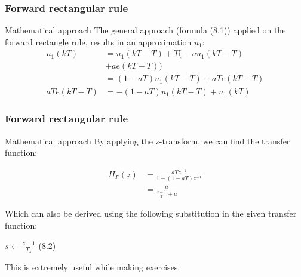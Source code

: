\begin{frame}
	\frametitle{Forward rectangular rule}
	\begin{block}{Mathematical approach}
		The general approach (formula (8.1)) applied on the forward rectangle rule, results in an approximation $u_1$:
		\begin{align*}
		u_1(kT)& =u_1(kT - T) + T\big(-au_1(kT - T)\\
		& + ae(kT - T) \big)\\
		& =(1 - aT)u_1(kT - T) + aTe(kT - T)\\
		aTe(kT-T) &= -(1 - aT)u_1(kT -T) + u_1(kT) 
		\end{align*}
	\end{block}
\end{frame}

\begin{frame}
	\frametitle{Forward rectangular rule}
	\begin{block}{Mathematical approach}
		By applying the z-transform, we can find the transfer function:
		\vspace{-2em}
		\begin{center}
			\begin{align*}
			H_F(z) &= \frac{aTz^{-1}}{1 - (1-aT)z^{-1}}\\
			&= \frac{a}{\frac{z-1}{T}+a}
			\end{align*}
		\end{center}
		Which can also be derived using the following substitution in the given transfer function:
		\begin{center}
			$s \gets \frac{z-1}{T_s}$ (8.2)
		\end{center}
		This is extremely useful while making exercises.
	\end{block}
\end{frame}	

